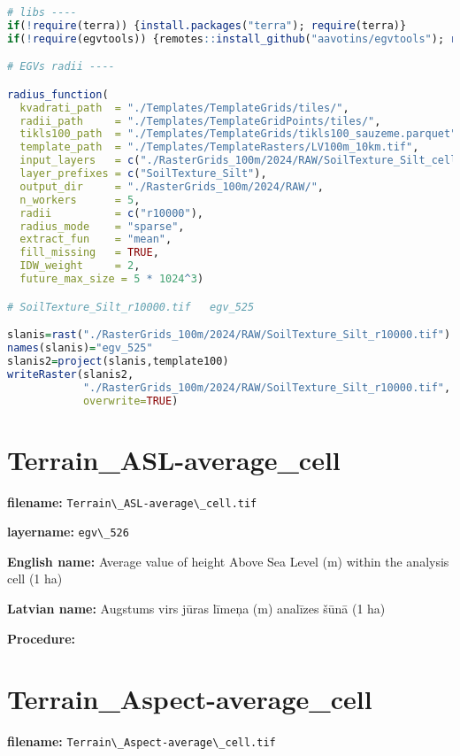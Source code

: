 \documentclass[
]{book}
\newcommand{\passthrough}[1]{#1}
\begin{document}
\begin{lstlisting}[language=R]
# libs ----
if(!require(terra)) {install.packages("terra"); require(terra)}
if(!require(egvtools)) {remotes::install_github("aavotins/egvtools"); require(egvtools)}

# EGVs radii ----

radius_function(
  kvadrati_path  = "./Templates/TemplateGrids/tiles/",
  radii_path     = "./Templates/TemplateGridPoints/tiles/",
  tikls100_path  = "./Templates/TemplateGrids/tikls100_sauzeme.parquet",
  template_path  = "./Templates/TemplateRasters/LV100m_10km.tif",
  input_layers   = c("./RasterGrids_100m/2024/RAW/SoilTexture_Silt_cell.tif"),
  layer_prefixes = c("SoilTexture_Silt"),
  output_dir     = "./RasterGrids_100m/2024/RAW/",
  n_workers      = 5,
  radii          = c("r10000"),
  radius_mode    = "sparse",
  extract_fun    = "mean",
  fill_missing   = TRUE,
  IDW_weight     = 2,
  future_max_size = 5 * 1024^3)

# SoilTexture_Silt_r10000.tif   egv_525

slanis=rast("./RasterGrids_100m/2024/RAW/SoilTexture_Silt_r10000.tif")
names(slanis)="egv_525"
slanis2=project(slanis,template100)
writeRaster(slanis2,
            "./RasterGrids_100m/2024/RAW/SoilTexture_Silt_r10000.tif",
            overwrite=TRUE)
\end{lstlisting}

\section{Terrain\_ASL-average\_cell}\label{ch06.526}

\textbf{filename:} \passthrough{\lstinline!Terrain\_ASL-average\_cell.tif!}

\textbf{layername:} \passthrough{\lstinline!egv\_526!}

\textbf{English name:} Average value of height Above Sea Level (m) within the analysis cell (1 ha)

\textbf{Latvian name:} Augstums virs jūras līmeņa (m) analīzes šūnā (1 ha)

\textbf{Procedure:}

\section{Terrain\_Aspect-average\_cell}\label{ch06.527}

\textbf{filename:} \passthrough{\lstinline!Terrain\_Aspect-average\_cell.tif!}
\end{document}
